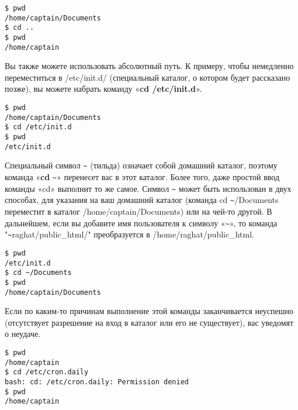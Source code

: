 \documentclass[12pt]{book}
\begin{document}
\vspace{3mm}
\begin{tcolorbox}
\begin{lstlisting}
$ pwd
/home/captain/Documents
$ cd ..
$ pwd
/home/captain
\end{lstlisting}
\end{tcolorbox}

Вы также можете использовать абсолютный путь. К примеру, чтобы немедленно переместиться в /etc/init.d/ (специальный каталог, о котором будет рассказано позже), вы можете набрать команду «\textbf{cd /etc/init.d}».

\vspace{3mm}
\begin{tcolorbox}
\begin{lstlisting}
$ pwd
/home/captain/Documents
$ cd /etc/init.d
$ pwd
/etc/init.d
\end{lstlisting}
\end{tcolorbox}

Специальный символ  \verb|~| (тильда) означает собой домашний каталог, поэтому команда «\textbf{cd} \verb|~|» перенесет вас в этот каталог.
Более того, даже простой ввод команды «cd» выполнит то же самое. 
Символ \verb|~| может быть использован в двух способах, для указания на ваш домашний каталог (команда cd \verb|~|/Documents переместит в каталог /home/captain/Documents) или на чей-то другой. 
В дальнейшем, если вы добавите имя пользователя к символу «\verb|~|», то команда "\verb|~|raghat/public\_html/"{} преобразуется в /home/raghat/public\_html.

\vspace{3mm}
\begin{tcolorbox}
\begin{lstlisting}
$ pwd
/etc/init.d
$ cd ~/Documents
$ pwd
/home/captain/Documents
\end{lstlisting}
\end{tcolorbox}

Если по каким-то причинам выполнение этой команды заканчивается неуспешно (отсутствует разрешение на вход в каталог или его не существует), вас уведомят о неудаче.

\vspace{3mm}
\begin{tcolorbox}
\begin{lstlisting}
$ pwd
/home/captain
$ cd /etc/cron.daily
bash: cd: /etc/cron.daily: Permission denied
$ pwd
/home/captain
\end{lstlisting}
\end{tcolorbox}
\end{document}
